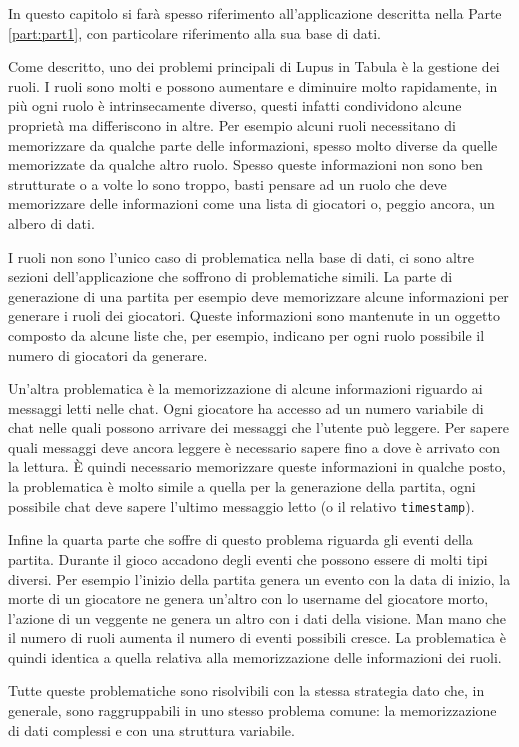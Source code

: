 In questo capitolo si farà spesso riferimento all'applicazione descritta nella Parte \ref{part:part1}, con particolare riferimento alla sua base di dati.

Come descritto, uno dei problemi principali di Lupus in Tabula è la gestione dei ruoli. I ruoli sono molti e possono aumentare e diminuire molto rapidamente, in più ogni ruolo è intrinsecamente diverso, questi infatti condividono alcune proprietà ma differiscono in altre. Per esempio alcuni ruoli necessitano di memorizzare da qualche parte delle informazioni, spesso molto diverse da quelle memorizzate da qualche altro ruolo. Spesso queste informazioni non sono ben strutturate o a volte lo sono troppo, basti pensare ad un ruolo che deve memorizzare delle informazioni come una lista di giocatori o, peggio ancora, un albero di dati.

I ruoli non sono l'unico caso di problematica nella base di dati, ci sono altre sezioni dell'applicazione che soffrono di problematiche simili. La parte di generazione di una partita per esempio deve memorizzare alcune informazioni per generare i ruoli dei giocatori. Queste informazioni sono mantenute in un oggetto composto da alcune liste che, per esempio, indicano per ogni ruolo possibile il numero di giocatori da generare.

Un'altra problematica è la memorizzazione di alcune informazioni riguardo ai messaggi letti nelle chat. Ogni giocatore ha accesso ad un numero variabile di chat nelle quali possono arrivare dei messaggi che l'utente può leggere. Per sapere quali messaggi deve ancora leggere è necessario sapere fino a dove è arrivato con la lettura. È quindi necessario memorizzare queste informazioni in qualche posto, la problematica è molto simile a quella per la generazione della partita, ogni possibile chat deve sapere l'ultimo messaggio letto (o il relativo \texttt{timestamp}).

Infine la quarta parte che soffre di questo problema riguarda gli eventi della partita. Durante il gioco accadono degli eventi che possono essere di molti tipi diversi. Per esempio l'inizio della partita genera un evento con la data di inizio, la morte di un giocatore ne genera un'altro con lo username del giocatore morto, l'azione di un veggente ne genera un altro con i dati della visione. Man mano che il numero di ruoli aumenta il numero di eventi possibili cresce. La problematica è quindi identica a quella relativa alla memorizzazione delle informazioni dei ruoli.

Tutte queste problematiche sono risolvibili con la stessa strategia dato che, in generale, sono raggruppabili in uno stesso problema comune: la memorizzazione di dati complessi e con una struttura variabile.